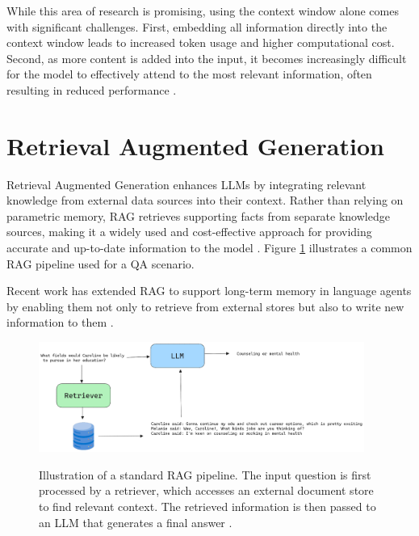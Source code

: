 \noindent While this area of research is promising, using the context window alone comes with significant challenges. First, embedding all information directly into the context window leads to increased token usage and higher computational cost. Second, as more content is added into the input, it becomes increasingly difficult for the model to effectively attend to the most relevant information, often resulting in reduced performance \cite{liu2023lostmiddlelanguagemodels}\cite{leng2024longcontextragperformance}.

\section{Retrieval Augmented Generation}

Retrieval Augmented Generation enhances LLMs by integrating relevant knowledge from external data sources into their context. Rather than relying on parametric memory, RAG retrieves supporting facts from separate knowledge sources, making it a widely used and cost-effective approach for providing accurate and up-to-date information to the model \cite{lewis2021retrievalaugmentedgenerationknowledgeintensivenlp}. Figure \ref{fig:rag} illustrates a common RAG pipeline used for a QA scenario.

\noindent Recent work has  extended RAG to support long-term memory in language agents by enabling them not only to retrieve from external stores but also to write new information to them \cite{Zhong_Guo_Gao_Ye_Wang_2024}.

\begin{figure}[h]
    \centering
    \includegraphics[width=0.95\textwidth]{images/rag.pdf}\\[-0.25cm]
    \caption{Illustration of a standard RAG pipeline. The input question is first processed by a retriever, which accesses an external document store to find relevant context. The retrieved information is then passed to an LLM that generates a final answer \cite{yaosu2024racm3}.}
    \label{fig:rag}
\end{figure}

